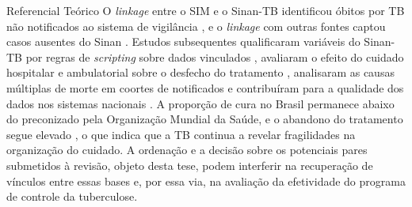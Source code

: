 \begin{chapter}{Referencial Teórico}
O \textit{linkage} entre o SIM e o Sinan-TB identificou óbitos por TB não notificados ao sistema de vigilância \cite{Sousa2011obitos, Oliveira2012uso}, e o \textit{linkage} com outras fontes captou casos ausentes do Sinan \cite{Pinheiro2012subnotificacao}. Estudos subsequentes qualificaram variáveis do Sinan-TB por regras de \textit{scripting} sobre dados vinculados \cite{Rocha2019scripting}, avaliaram o efeito do cuidado hospitalar e ambulatorial sobre o desfecho do tratamento \cite{Rocha2018sobrevida}, analisaram as causas múltiplas de morte em coortes de notificados \cite{Rocha2015causas} e contribuíram para a qualidade dos dados nos sistemas nacionais \cite{Bartholomay2014improved}. A proporção de cura no Brasil permanece abaixo do preconizado pela Organização Mundial da Saúde, e o abandono do tratamento segue elevado \cite{Brasil2024tb, WHO2024tb}, o que indica que a TB continua a revelar fragilidades na organização do cuidado. A ordenação e a decisão sobre os potenciais pares submetidos à revisão, objeto desta tese, podem interferir na recuperação de vínculos entre essas bases e, por essa via, na avaliação da efetividade do programa de controle da tuberculose.


\end{chapter}
